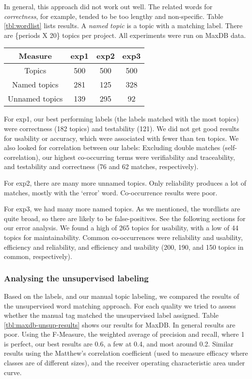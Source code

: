 \documentclass[10pt, conference, compsocconf]{IEEEtran}
\begin{document}

In general, this approach did not work out well. The related words for \emph{correctness}, for example, tended to be too lengthy and non-specific. Table \ref{tbl:wordlist} lists results. A \emph{named topic} is a topic with a matching label. There are \{periods X 20\} topics per project. All experiments were run on MaxDB data.

\begin{table*}[h]
	\caption{Automatic topic labeling}
	\centering
	\label{tbl:wordlist}
\begin{tabular}{c|c|c|c}
\toprule
Measure &		 \textsf{exp1} &	 \textsf{exp2} &	 \textsf{exp3} \\
\midrule
Topics &			500		 &			500  	 & 		500  \\
Named topics &		281      &			125      &		328  \\
Unnamed topics &	139      &			295      &      92   \\
\bottomrule
\end{tabular}
\end{table*}

For \textsf{exp1}, our best performing labels (the labels matched with the most topics) were correctness (182 topics) and testability (121). We did not get good results for usability or accuracy, which were associated with fewer than ten topics. We also looked for correlation between our labels: Excluding double matches (self-correlation), our highest co-occurring terms were verifiability and traceability, and testability and correctness (76 and 62 matches, respectively).

For \textsf{exp2}, there are many more unnamed topics. Only reliability produces a lot of matches, mostly with the `error' word. Co-occurrence results were poor.

For \textsf{exp3}, we had many more named topics. As we mentioned, the wordlists are quite broad, so there are likely to be false-positives. See the following sections for our error analysis. We found a high of 265 topics for usability, with a low of 44 topics for maintainability. Common co-occurrences were reliability and usability, efficiency and reliability, and efficiency and usability (200, 190, and 150 topics in common, respectively). 

\subsubsection{Analysing the unsupervised labeling}
Based on the labels, and our manual topic labeling, we compared the results of the unsupervised word matching approach. For each quality we tried to assess whether the manual tag matched the unsupervised label assigned. Table \ref{tbl:maxdb-unsup-results} shows our results for MaxDB. In general results are poor. Using the F-Measure, the weighted average of precision and recall, where 1 is perfect, our best results are 0.6, a few at 0.4, and most around 0.2. Similar results using the Matthew's correlation coefficient (used to measure efficacy where classes are of different sizes), and the receiver operating characteristic area under curve. 
\end{document}

